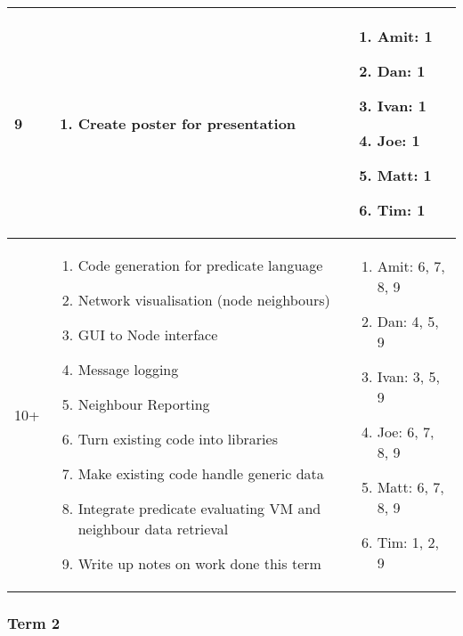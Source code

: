 \begin{center}
\begin{longtable}{| l | p{9cm} | p{3.5cm} |}
	9 & \begin{enumerate}
			\item Create poster for presentation
		\end{enumerate} &
	\begin{enumerate}
		\item[] Amit: 1
		\item[] Dan: 1
		\item[] Ivan: 1
		\item[] Joe: 1
		\item[] Matt: 1
		\item[] Tim: 1
	\end{enumerate}
	\\ \hline

	10+ & \begin{enumerate}
			\item Code generation for predicate language
			\item Network visualisation (node neighbours)
			\item GUI to Node interface
			\item Message logging
			\item Neighbour Reporting
			\item Turn existing code into libraries
			\item Make existing code handle generic data
			\item Integrate predicate evaluating VM and neighbour data retrieval
			\item Write up notes on work done this term
		\end{enumerate} &
	\begin{enumerate}
		\item[] Amit: 6, 7, 8, 9
		\item[] Dan: 4, 5, 9
		\item[] Ivan: 3, 5, 9
		\item[] Joe: 6, 7, 8, 9
		\item[] Matt: 6, 7, 8, 9
		\item[] Tim: 1, 2, 9
	\end{enumerate}
	\\ \hline
	
	\end{longtable}
\end{center}

\subsubsection{Term 2}

